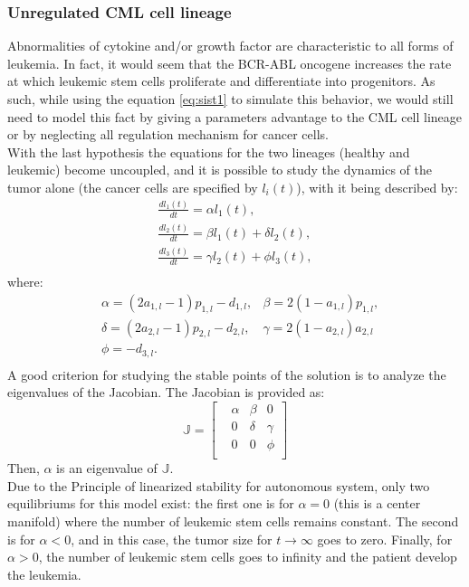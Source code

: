\documentclass[a4paper,10pt]{article}
\begin{document}
\subsubsection{Unregulated CML cell lineage}
Abnormalities of cytokine and/or growth factor are characteristic to all forms of leukemia. 
In fact, it would seem that the BCR-ABL oncogene increases the rate at which leukemic stem
cells proliferate and differentiate into progenitors. As such, while using the equation \eqref{eq:sist1} 
to simulate this behavior, we would still need to model this fact by giving a parameters advantage 
to the CML cell lineage or by neglecting all regulation mechanism for cancer cells.\\
With the last hypothesis the equations for the two lineages (healthy and leukemic) become uncoupled,
and it is possible to study the dynamics of the tumor alone (the cancer cells are specified by $l_i(t)$),
with it being described by:
\begin{equation}
\begin{array}{ll}
\frac{dl_{1}(t)}{dt}=\alpha l_{1}(t), \\
\frac{dl_{2}(t)}{dt}=\beta l_{1}(t)+\delta l_{2}(t),\\
\frac{dl_{3}(t)}{dt}= \gamma l_{2}(t)+ \phi l_{3}(t),\\
\end{array}
\label{eq:sist-semplificato}
\end{equation}
where:
\begin{equation}
\begin{array}{lll}
&\alpha=(2a_{1,l}-1)p_{1,l}-d_{1,l},& \beta=2(1-a_{1,l})p_{1,l}, \\
&\delta=(2a_{2,l}-1)p_{2,l}-d_{2,l},& \gamma=2(1-a_{2,l})a_{2,l} \\
&\phi=-d_{3,l}.& \\
\end{array}
\end{equation} 
A good criterion for studying the stable points of the solution is
to analyze the eigenvalues of the Jacobian. 
The Jacobian is provided as:
\begin{equation}
\mathbb{J}= \begin{bmatrix}
&\alpha &\beta & 0\\
&0 & \delta & \gamma\\
& 0 & 0 & \phi \\
\end{bmatrix}
\end{equation}
Then, $\alpha$ is an eigenvalue of $\mathbb{J}$.\\
Due to the Principle of linearized stability for autonomous system,
only two equilibriums for this model exist: the first one 
is for $\alpha=0$ (this is a center manifold)
where the number of leukemic stem cells remains constant.
The second is for $\alpha < 0$, and in this case, 
the tumor size for $t\longrightarrow\infty$ goes to zero.
Finally, for $\alpha>0$, the number of leukemic stem cells goes to infinity
and the patient develop the leukemia. \\
\end{document}
